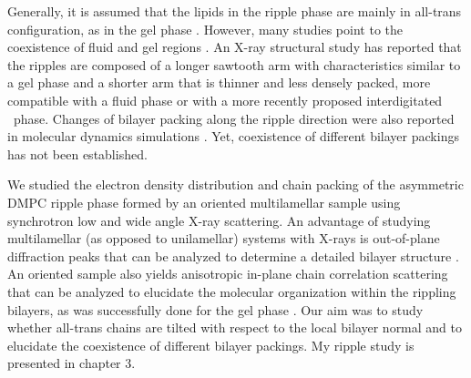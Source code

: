 Generally, it is assumed that the lipids in the ripple phase are mainly in all-trans
configuration, as in the gel phase \cite{ref:Sengupta03}.
However, many studies point to the coexistence of fluid and gel regions
\cite{ref:Wittebort81,ref:Schneider83,ref:Sun96,ref:Marsh80,ref:Cunningham98,ref:Rappolt00}.
An X-ray structural study has reported that the ripples are composed of 
a longer sawtooth arm with characteristics similar to a gel phase
and a shorter arm that is thinner and less densely packed\cite{ref:Sun96}, 
more compatible with a fluid phase or with a more recently proposed
interdigitated \LI\ phase.
Changes of bilayer packing along the ripple direction were also reported in
molecular dynamics simulations \cite{ref:deVries05}.
Yet, coexistence of different bilayer packings has not been established.
 

We studied the electron density distribution and chain packing 
of the asymmetric DMPC ripple phase formed by an oriented multilamellar sample
using synchrotron low and wide angle X-ray scattering.
An advantage of studying multilamellar (as opposed to unilamellar) systems with X-rays 
is out-of-plane diffraction peaks that can be analyzed to determine a detailed
bilayer structure \cite{ref:Sun96,ref:Sengupta03}.
An oriented sample also yields anisotropic
in-plane chain correlation scattering 
that can be analyzed to elucidate the molecular organization within 
the rippling bilayers, as was successfully done for the gel phase 
\cite{ref:Tardieu73,ref:Smith88,ref:Tristram93}.
Our aim was to study whether all-trans chains are tilted with respect to 
the local bilayer normal and to elucidate the coexistence of different bilayer packings.
My ripple study is presented in chapter 3. 

